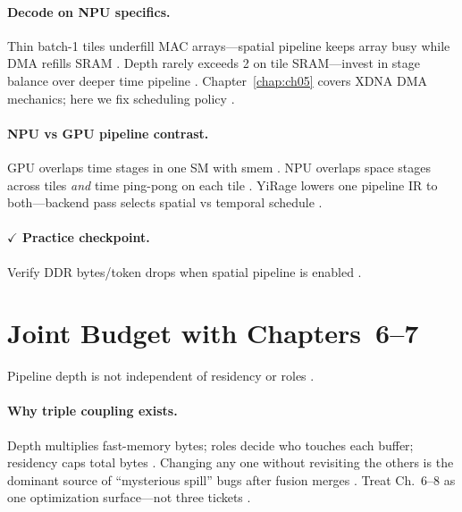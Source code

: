 \paragraph{Decode on NPU specifics.}
Thin batch-1 tiles underfill MAC arrays---spatial pipeline keeps array busy while DMA refills SRAM \citep{patel2025llminference,amd2024aie}.
Depth rarely exceeds 2 on tile SRAM---invest in stage balance over deeper time pipeline \citep{yirage2026,memoryfloor2026,amd2024xdna}.
Chapter~\ref{chap:ch05} covers XDNA DMA mechanics; here we fix scheduling policy \citep{amd2024xdna,chen2020compilerbasedhardw}.

\paragraph{NPU vs GPU pipeline contrast.}
GPU overlaps time stages in one SM with smem \citep{semianalysis2024tma,nvidia2022hopper}.
NPU overlaps space stages across tiles \emph{and} time ping-pong on each tile \citep{amd2024aie,amd2024xdna}.
YiRage lowers one pipeline IR to both---backend pass selects spatial vs temporal schedule \citep{yirage2026,wu2024mirage,patel2025llminference}.

\paragraph{$\checkmark$ Practice checkpoint.}
Verify DDR bytes/token drops when spatial pipeline is enabled \citep{memoryfloor2026,amd2024aie}.

\section{Joint Budget with Chapters~6--7}
\label{sec:ch08_joint_budget}

Pipeline depth is not independent of residency or roles \citep{yirage2026,dao2022flashattention,shah2024flashattention3,chen2020compilerbasedhardw}.

\paragraph{Why triple coupling exists.}
Depth multiplies fast-memory bytes; roles decide who touches each buffer; residency caps total bytes \citep{memoryfloor2026,dao2022flashattention,yirage2026}.
Changing any one without revisiting the others is the dominant source of ``mysterious spill'' bugs after fusion merges \citep{chen2020compilerbasedhardw,wu2024mirage,taxbreak2026}.
Treat Ch.~6--8 as one optimization surface---not three tickets \citep{mpk2025,patel2025llminference,shah2024flashattention3}.

